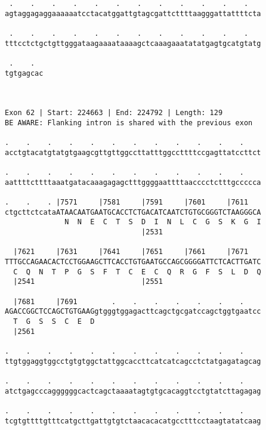 \documentclass{article}
\begin{document}
\begin{Verbatim}
 .    .    .    .    .    .    .    .    .    .    .    .   
agtaggagaggaaaaaatcctacatggattgtagcgattcttttaagggattattttcta
                                                            
 .    .    .    .    .    .    .    .    .    .    .    .   
tttcctctgctgttgggataagaaaataaaagctcaaagaaatatatgagtgcatgtatg
                                                            
 .    .  
tgtgagcac
         
         
 
Exon 62 | Start: 224663 | End: 224792 | Length: 129
BE AWARE: Flanking intron is shared with the previous exon
 
.    .    .    .    .    .    .    .    .    .    .    .    
acctgtacatgtatgtgaagcgttgttggccttatttggccttttccgagttatccttct
                                                            
.    .    .    .    .    .    .    .    .    .    .    .    
aattttcttttaaatgatacaaagagagctttggggaattttaacccctctttgccccca
                                                            
.    .    . |7571     |7581     |7591     |7601     |7611   
ctgcttctcataATAACAATGAATGCACCTCTGACATCAATCTGTGCGGGTCTAAGGGCA
              N  N  E  C  T  S  D  I  N  L  C  G  S  K  G  I
                                |2531                       
  
  |7621     |7631     |7641     |7651     |7661     |7671   
TTTGCCAGAACACTCCTGGAAGCTTCACCTGTGAATGCCAGCGGGGATTCTCACTTGATC
  C  Q  N  T  P  G  S  F  T  C  E  C  Q  R  G  F  S  L  D  Q
  |2541                         |2551                       
  
  |7681     |7691        .    .    .    .    .    .    .    
AGACCGGCTCCAGCTGTGAAGgtgggtggagacttcagctgcgatccagctggtgaatcc
  T  G  S  S  C  E  D                                       
  |2561                                                     
  
.    .    .    .    .    .    .    .    .    .    .    .    
ttgtggaggtggcctgtgtggctattggcaccttcatcatcagcctctatgagatagcag
                                                            
.    .    .    .    .    .    .    .    .    .    .    .    
atctgagcccaggggggcactcagctaaaatagtgtgcacaggtcctgtatcttagagag
                                                            
.    .    .    .    .    .    .    .    .    .    .    .    
tcgtgttttgtttcatgcttgattgtgtctaacacacatgcctttcctaagtatatcaag
                                                            

\end{Verbatim}
\end{document}
